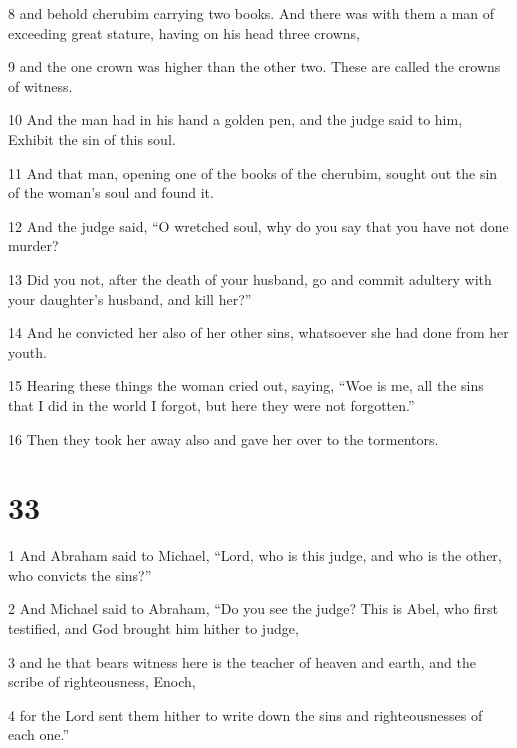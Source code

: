 \par 8 and behold cherubim carrying two books. And there was with them a man of exceeding great stature, having on his head three crowns, 

\par 9 and the one crown was higher than the other two. These are called the crowns of witness. 

\par 10 And the man had in his hand a golden pen, and the judge said to him, Exhibit the sin of this soul. 

\par 11 And that man, opening one of the books of the cherubim, sought out the sin of the woman's soul and found it. 

\par 12 And the judge said, “O wretched soul, why do you say that you have not done murder? 

\par 13 Did you not, after the death of your husband, go and commit adultery with your daughter's husband, and kill her?” 

\par 14 And he convicted her also of her other sins, whatsoever she had done from her youth. 

\par 15 Hearing these things the woman cried out, saying, “Woe is me, all the sins that I did in the world I forgot, but here they were not forgotten.” 

\par 16 Then they took her away also and gave her over to the tormentors.

\chapter{33}

\par 1 And Abraham said to Michael, “Lord, who is this judge, and who is the other, who convicts the sins?” 

\par 2 And Michael said to Abraham, “Do you see the judge? This is Abel, who first testified, and God brought him hither to judge, 

\par 3 and he that bears witness here is the teacher of heaven and earth, and the scribe of righteousness, Enoch, 

\par 4 for the Lord sent them hither to write down the sins and righteousnesses of each one.” 

